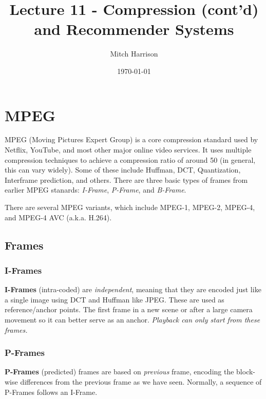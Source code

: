 \documentclass[titlepage, 12pt, leqno]{article}
\title{\Huge{Lecture 11 - Compression (cont'd) and Recommender Systems}}
\author{\large{Mitch Harrison}}
\date{\today}
\begin{document}
\setlength{\parskip}{1\baselineskip}
\setlength{\parindent}{15pt}
\maketitle
\tableofcontents
\newpage


\section{MPEG}

MPEG (Moving Pictures Expert Group) is a core compression standard used by 
Netflix, YouTube, and most other major online video services. It uses multiple
compression techniques to achieve a compression ratio of around 50 (in general,
this can vary widely). Some of these include Huffman, DCT, Quantization,
Interframe prediction, and others. There are three basic types of frames from 
earlier MPEG stanards: \textit{I-Frame}, \textit{P-Frame}, and \textit{B-Frame}.

\begin{note}
    There are several MPEG variants, which include MPEG-1, MPEG-2, MPEG-4, and
    MPEG-4 AVC (a.k.a. H.264).
\end{note}

\subsection{Frames}

\subsubsection{I-Frames}
\textbf{I-Frames} (intra-coded) are \textit{independent}, meaning that they
are encoded just like a single image using DCT and Huffman like JPEG. These
are used as reference/anchor points.
The first frame in a new scene or after a large camera movement so it can better
serve as an anchor. \textit{Playback can only start from these frames.}

\subsubsection{P-Frames}
\textbf{P-Frames} (predicted) frames are based on \textit{previous} frame, 
encoding the block-wise differences from the previous frame as we have seen.
Normally, a sequence of P-Frames follows an I-Frame.
\end{document}
